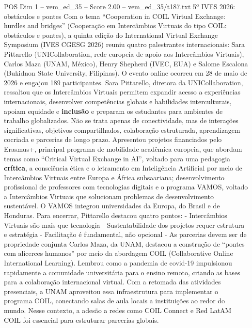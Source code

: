 \begin{textsample}{POS Dim 1 – vem\_ed\_35 – Score 2.00 – vem\_ed\_35/t187.txt}  \label{ex:f1_pos_054}
5º IVES 2026: obstáculos e pontes Com o tema “Cooperation in COIL Virtual Exchange: hurdles and bridges” (Cooperação em Intercâmbios Virtuais do tipo COIL: obstáculos e pontes), a quinta edição do International Virtual Exchange Symposium (IVES CGESG 2026) reuniu quatro palestrantes internacionais: Sara Pittarello (UNICollaboration, rede europeia de apoio aos Intercâmbios Virtuais), Carlos Maza (UNAM, México), Henry Shepherd (IVEC, EUA) e Salome Escalona (Bukidnon State University, Filipinas).
O evento online ocorreu em 28 de maio de 2026 e engajou 189 participantes.
Sara Pittarello, diretora da UNICollaboration, ressaltou que os Intercâmbios Virtuais permitem expandir acesso a experiências internacionais, desenvolver competências globais e habilidades interculturais, apoiam equidade e \textbf{inclusão} e preparam os estudantes para ambientes de trabalho globalizados.
Não se trata apenas de conectividade, mas de interações significativas, objetivos compartilhados, colaboração estruturada, aprendizagem cocriada e parcerias de longo prazo.
Apresentou projetos financiados pelo Erasmus+, principal programa de mobilidade acadêmica europeia, que abordam temas como “Critical Virtual Exchange in AI”, voltado para uma pedagogia \textbf{crítica}, a consciência ética e o letramento em Inteligência Artificial por meio de Intercâmbios Virtuais entre Europa e África subsaariana; desenvolvimento profissional de professores com tecnologias digitais e o programa VAMOS, voltado a Intercâmbios Virtuais que solucionam problemas de desenvolvimento sustentável.
O VAMOS integrou universidades da Europa, do Brasil e de Honduras.
Para encerrar, Pittarello destacou quatro pontos: - Intercâmbios Virtuais são mais que tecnologia - Sustentabilidade dos projetos requer estrutura e estratégia - Facilitação é fundamental, não opcional - As parcerias devem ser de propriedade conjunta Carlos Maza, da UNAM, destacou a construção de “pontes com alicerces humanos” por meio da abordagem COIL (Collaborative Online International Learning).
Lembrou como a pandemia de covid-19 impulsionou rapidamente a comunidade universitária para o ensino remoto, criando as bases para a colaboração internacional virtual.
Com a retomada das atividades presenciais, a UNAM aproveitou essa infraestrutura para implementar o programa COIL, conectando salas de aula locais a instituições ao redor do mundo.
Nesse contexto, a adesão a redes como COIL Connect e Red LatAM COIL foi essencial para estruturar parcerias globais.

\end{textsample}
